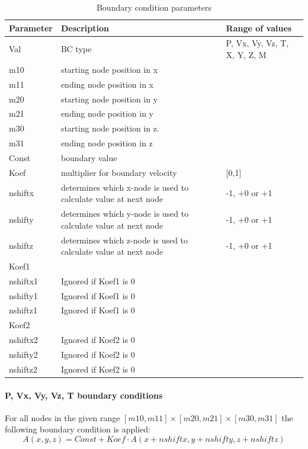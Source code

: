 \begin{table}[H]
	\small
	\centering
	\begin{tabular}{l l l}
		\toprule
		Parameter & Description & Range of values \\
		\midrule
		Val & BC type & P, Vx, Vy, Vz, T, X, Y, Z, M \\
		m10 & starting node position in x &  \\ 
		m11 & ending node position in x &  \\ 
		m20 & starting node position in y &  \\ 
		m21 & ending node position in y &  \\ 
		m30 & starting node position in z. &  \\ 
		m31 & ending node position in z &  \\ 
		Const & boundary value &  \\ 
		Koef &  multiplier for boundary velocity & [0,1] \\ 
		nshiftx & determines which x-node is used to calculate value at next node & -1, +0 or +1 \\ 
		nshifty & determines which y-node is used to calculate value at next node & -1, +0 or +1 \\ 
		nshiftz & determines which z-node is used to calculate value at next node & -1, +0 or +1 \\ 
		Koef1 &  &  \\ 
		nshiftx1 & Ignored if Koef1 is 0 &  \\ 
		nshifty1 & Ignored if Koef1 is 0 &  \\ 
		nshiftz1 & Ignored if Koef1 is 0 &  \\ 
		Koef2 &  &  \\ 
		nshiftx2 & Ignored if Koef2 is 0 &  \\ 
		nshifty2 & Ignored if Koef2 is 0 &  \\ 
		nshiftz2 & Ignored if Koef2 is 0 &  \\ 
		\bottomrule
	\end{tabular}
	\caption{Boundary condition parameters}
	\label{tbl:BC_parameters}
\end{table}

\paragraph{P, Vx, Vy, Vz, T boundary conditions}
For all nodes in the given range $[m10,m11]\times[m20,m21]\times[m30,m31]$ the following boundary condition is applied:
\begin{equation}\label{eqs:PVT_BC_general}
	A(x,y,z) = Const + Koef \cdot A(x+nshiftx,y+nshifty,z+nshiftz)
\end{equation}

